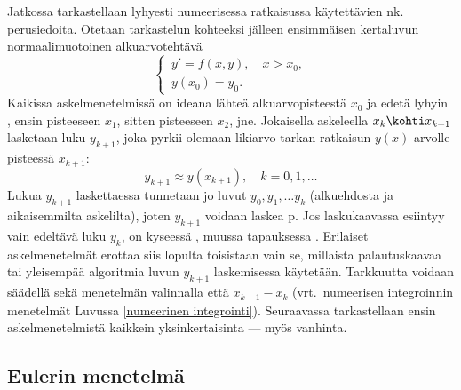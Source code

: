 Jatkossa tarkastellaan lyhyesti  numeerisessa ratkaisussa käytettävien
%
nk.\  perusiedoita. Otetaan tarkastelun kohteeksi jälleen ensimmäisen
kertaluvun normaalimuotoinen alkuarvotehtävä
\begin{equation} \label{dy-7: ivp}
\begin{cases}
\,y'=f(x,y),\quad x>x_0, \\
\,y(x_0)=y_0.
\end{cases}
\end{equation}
Kaikissa askelmenetelmissä on ideana lähteä alkuarvopisteestä $x_0$ ja edetä lyhyin 
, ensin pisteeseen $x_1$, sitten pisteeseen $x_2$, jne. Jokaisella askeleella
$x_k \kohti x_{k+1}$ lasketaan luku $y_{k+1}$, joka pyrkii olemaan likiarvo tarkan ratkaisun
$y(x)$ arvolle pisteessä $x_{k+1}$:
\[
y_{k+1}\approx y(x_{k+1}),\quad k=0,1,\ldots
\]
Lukua $y_{k+1}$ laskettaessa tunnetaan jo luvut $y_0,y_1, \ldots y_{k}$ (alkuehdosta ja 
aikaisemmilta askelilta), joten $y_{k+1}$ voidaan laskea p. Jos laskukaavassa
esiintyy vain edeltävä luku $y_k$, on kyseessä 
, muussa tapauksessa .
Erilaiset askelmenetelmät erottaa siis lopulta toisistaan vain se,
millaista palautuskaavaa tai yleisempää algoritmia luvun $y_{k+1}$ laskemisessa käytetään.
Tarkkuutta voidaan säädellä sekä menetelmän valinnalla että
%
 $x_{k+1}-x_k$ (vrt.\ numeerisen integroinnin menetelmät Luvussa
\ref{numeerinen integrointi}). Seuraavassa tarkastellaan ensin askelmenetelmistä kaikkein
yksinkertaisinta --- myös vanhinta.

\subsection{Eulerin menetelmä}

